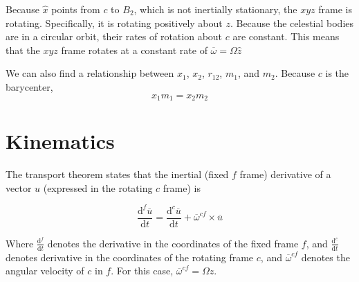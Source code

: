 \documentclass{article}
\newcommand{\dd}[2]{\frac{\mathrm{d}#1}{\mathrm{d}#2}}
\newcommand{\vv}[1]{\overline{#1}}
\begin{document}
\begin{comment}
\begin{figure}[H]
    \centering
    \begin{tikzpicture}[
        point/.style = {circle, draw=#1, fill=#1, node contents={}, inner sep=0.05cm},
        >=latex
        ]

        \node (B1) at (-1,0)     [point=green, label=left:$B_1$];
        \node (B2) at (3,0)      [point=blue, label=right:$B_2$];
        \node (o) at (0,0)      [point=black, label=below:$c$];
        \node (S) at (1.5,0.75)    [point=red, label=above:$S$];

        \draw[->, blue] (B2) -> node[below] {$\vv{r}_2$} (S);
        \draw[->, green] (B1) -> node[above] {$\vv{r}_1$} (S);
        \draw[->, black] (o) -> node[below] {$\vv{r}$} (S);
    \end{tikzpicture}
    \caption{Vectors. Note $x_1$ refers to the distance from $c$ to $B_1$ and $x_2$ refers to the distance from $c$ to $B_2$. Predictably, $r_{12}=x_1+x_2$ is the distance between the bodies}
\end{figure}
\end{comment}

Because $\hat{x}$ points from $c$ to $B_2$, which is not inertially stationary, the $xyz$ frame is rotating. Specifically, it is rotating positively about $z$. Because the celestial bodies are in a circular orbit, their rates of rotation about $c$ are constant. This means that the $xyz$ frame rotates at a constant rate of $\vv{\omega}=\Omega\hat{z}$ 

We can also find a relationship between $x_1$, $x_2$, $r_{12}$, $m_1$, and $m_2$. Because $c$ is the barycenter,
\[\boxed{x_1m_1=x_2m_2}\]

\section*{Kinematics}
The transport theorem states that the inertial (fixed $f$ frame) derivative of a vector $u$ (expressed in the rotating $c$ frame) is

\[\dd{^f \vv{u}}{t}=\dd{^c\vv{u}}{t}+\vv{\omega}^{cf}\times\vv{u}\]

Where $\dd{^f}{t}$ denotes the derivative in the coordinates of the fixed frame $f$, and $\dd{^c}{t}$ denotes derivative in the coordinates of the rotating frame $c$, and $\vv{\omega}^{cf}$ denotes the angular velocity of $c$ in $f$. For this case, $\vv{\omega}^{cf}=\Omega\hat{z}$.
\end{document}
